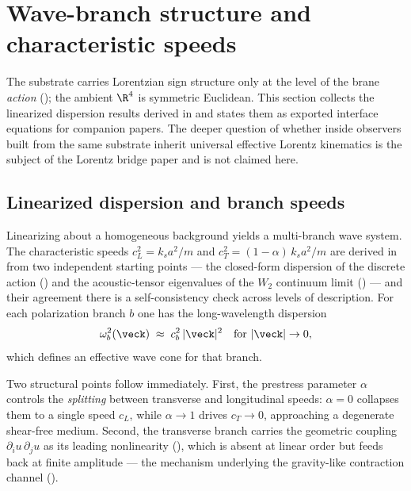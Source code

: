 \section{Wave-branch structure and characteristic speeds}
\label{sec:waves}

The substrate carries Lorentzian sign structure only at the level of the brane \emph{action}
(); the ambient $\R^4$ is symmetric Euclidean.
This section collects the linearized dispersion results derived in 
and states them as exported interface equations for companion papers.
The deeper question of whether inside observers built from the same substrate inherit universal
effective Lorentz kinematics is the subject of the Lorentz bridge paper and is not claimed here.

\subsection{Linearized dispersion and branch speeds}

Linearizing  about a homogeneous background yields a multi-branch wave system.
The characteristic speeds $c_L^2 = k_s a^2/m$ and $c_T^2 = (1-\alpha)\,k_s a^2/m$ are derived
in  from two independent starting points --- the closed-form dispersion
of the discrete action () and the acoustic-tensor eigenvalues of the $W_2$
continuum limit () --- and their agreement there is a self-consistency
check across levels of description.
For each polarization branch $b$ one has the long-wavelength dispersion
\begin{equation}
  \omega_b^2(\veck)\;\approx\; c_b^2\,|\veck|^2 \quad \text{for } |\veck|\to 0,
  \label{eq:linear-dispersion}
\end{equation}
which defines an effective wave cone for that branch.

Two structural points follow immediately.
First, the prestress parameter $\alpha$ controls the \emph{splitting} between transverse and
longitudinal speeds: $\alpha=0$ collapses them to a single speed $c_L$, while $\alpha\to 1$
drives $c_T\to 0$, approaching a degenerate shear-free medium.
Second, the transverse branch carries the geometric coupling
$\partial_i u\,\partial_j u$ as its leading nonlinearity (), which
is absent at linear order but feeds back at finite amplitude --- the mechanism underlying
the gravity-like contraction channel ().

